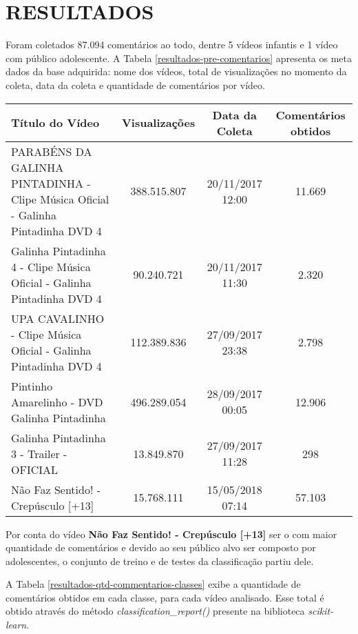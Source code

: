 \newpage
\section{RESULTADOS}

Foram coletados 87.094 comentários ao todo, dentre 5 vídeos infantis e 1 vídeo com público adolescente.
A Tabela \ref{resultados-pre-comentarios} apresenta os meta dados da base adquirida: nome dos vídeos,  total de visualizações no momento da coleta, data da coleta e quantidade de comentários por vídeo.

\begin{table}[H] \footnotesize
\centering
\begin{tabular}{|p{5.5cm}|c|c|c|}
\hline
\textbf{Título do Vídeo} & \textbf{Visualizações} & \textbf{Data da Coleta} & \textbf{Comentários obtidos} \\ \hline
PARABÉNS DA GALINHA PINTADINHA - Clipe Música Oficial - Galinha Pintadinha DVD 4 & 388.515.807 & 20/11/2017 12:00 & 11.669 \\ \hline
Galinha Pintadinha 4 - Clipe Música Oficial - Galinha Pintadinha DVD 4 & 90.240.721 & 20/11/2017 11:30 & 2.320 \\ \hline
UPA CAVALINHO - Clipe Música Oficial - Galinha Pintadinha DVD 4 & 112.389.836 & 27/09/2017 23:38 & 2.798 \\ \hline
Pintinho Amarelinho - DVD Galinha Pintadinha & 496.289.054 & 28/09/2017 00:05 & 12.906 \\ \hline
Galinha Pintadinha 3 - Trailer - OFICIAL & 13.849.870 & 27/09/2017 11:28 & 298 \\ \hline
Não Faz Sentido! - Crepúsculo [+13] & 15.768.111 & 15/05/2018 07:14 & 57.103 \\ \hline
\end{tabular}

\end{table}

Por conta do vídeo \textbf{Não Faz Sentido! - Crepúsculo [+13]} ser o com maior quantidade de comentários e devido ao seu público alvo ser composto por adolescentes, o conjunto de treino e de testes da classificação partiu dele. 

A Tabela \ref{resultados-qtd-commentarios-classes} exibe a quantidade de comentários obtidos em cada classe, para cada vídeo analisado. Esse total é obtido através do método \textit{classification\_report()} presente na biblioteca \textit{scikit-learn}.

